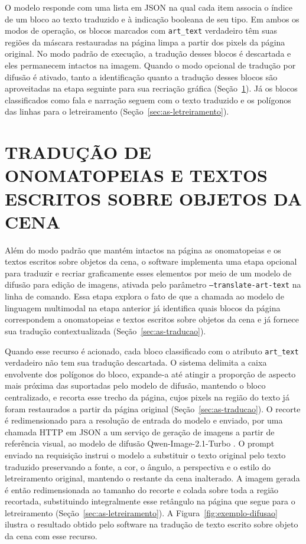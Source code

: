 \documentclass[
    12pt,
    openright,
    oneside,
    a4paper,
    chapter=TITLE,
    section=TITLE,
    english,
    brazilian,
    brazil
]{abntex2}
\begin{document}
O modelo responde com uma lista em JSON na qual cada item associa o índice de um bloco ao texto traduzido e à indicação booleana de seu tipo. Em ambos os modos de operação, os blocos marcados com \texttt{art\_text} verdadeiro têm suas regiões da máscara restauradas na página limpa a partir dos pixels da página original. No modo padrão de execução, a tradução desses blocos é descartada e eles permanecem intactos na imagem. Quando o modo opcional de tradução por difusão é ativado, tanto a identificação quanto a tradução desses blocos são aproveitadas na etapa seguinte para sua recriação gráfica (Seção~\ref{sec:as-difusao}). Já os blocos classificados como fala e narração seguem com o texto traduzido e os polígonos das linhas para o letreiramento (Seção~\ref{sec:as-letreiramento}).

\section{TRADUÇÃO DE ONOMATOPEIAS E TEXTOS ESCRITOS SOBRE OBJETOS DA CENA}
\label{sec:as-difusao}

Além do modo padrão que mantém intactos na página as onomatopeias e os textos escritos sobre objetos da cena, o software implementa uma etapa opcional para traduzir e recriar graficamente esses elementos por meio de um modelo de difusão para edição de imagens, ativada pelo parâmetro \texttt{--translate-art-text} na linha de comando. Essa etapa explora o fato de que a chamada ao modelo de linguagem multimodal na etapa anterior já identifica quais blocos da página correspondem a onomatopeias e textos escritos sobre objetos da cena e já fornece sua tradução contextualizada (Seção~\ref{sec:as-traducao}).

Quando esse recurso é acionado, cada bloco classificado com o atributo \texttt{art\_text} verdadeiro não tem sua tradução descartada. O sistema delimita a caixa envolvente dos polígonos do bloco, expande-a até atingir a proporção de aspecto mais próxima das suportadas pelo modelo de difusão, mantendo o bloco centralizado, e recorta esse trecho da página, cujos pixels na região do texto já foram restaurados a partir da página original (Seção~\ref{sec:as-traducao}). O recorte é redimensionado para a resolução de entrada do modelo e enviado, por uma chamada HTTP em JSON a um serviço de geração de imagens a partir de referência visual, ao modelo de difusão Qwen-Image-2.1-Turbo \cite{qwenimage21turbo}. O prompt enviado na requisição instrui o modelo a substituir o texto original pelo texto traduzido preservando a fonte, a cor, o ângulo, a perspectiva e o estilo do letreiramento original, mantendo o restante da cena inalterado. A imagem gerada é então redimensionada ao tamanho do recorte e colada sobre toda a região recortada, substituindo integralmente esse retângulo na página que segue para o letreiramento (Seção~\ref{sec:as-letreiramento}). A Figura~\ref{fig:exemplo-difusao} ilustra o resultado obtido pelo software na tradução de texto escrito sobre objeto da cena com esse recurso.
\end{document}
